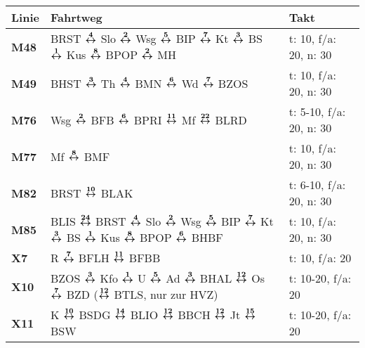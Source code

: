 \begin{minipage}[t]{0.05\textwidth}
\phantom{Tor}
\end{minipage}
\begin{minipage}[t]{0.45\textwidth}
\begin{tabular}{>{\bfseries}L{1.2cm}L{9.0cm}L{3.0cm}}
{\bfseries Linie} & {\bfseries Fahrtweg} & {\bfseries Takt} \\
\hline
\mbus{} M48   & BRST $\xarwe{4}$ Slo $\xarwe{2}$ Wsg $\xarwe{5}$ BIP $\xarwe{7}$ Kt $\xarwe{3}$ BS $\xarwe{1}$ Kus $\xarwe{8}$ BPOP $\xarwe{2}$ MH                                  & t: 10, f/a: 20, n: 30      \\
\mbus{} M49   & BHST $\xarwe{3}$ Th $\xarwe{4}$ BMN $\xarwe{6}$ Wd $\xarwe{7}$ BZOS                                                                                                 & t: 10, f/a: 20, n: 30      \\
\mbus{} M76   & Wsg $\xarwe{2}$ BFB $\xarwe{6}$ BPRI $\xarwe{11}$ Mf $\xarwe{22}$ BLRD                                                                                              & t: 5-10, f/a: 20, n: 30    \\
\mbus{} M77   & Mf $\xarwe{8}$ BMF                                                                                                                                                  & t: 10, f/a: 20, n: 30      \\
\mbus{} M82   & BRST $\xarwe{10}$ BLAK                                                                                                                                              & t: 6-10, f/a: 20, n: 30    \\
\mbus{} M85   & BLIS $\xarwe{24}$ BRST $\xarwe{4}$ Slo $\xarwe{2}$ Wsg $\xarwe{5}$ BIP $\xarwe{7}$ Kt $\xarwe{3}$ BS $\xarwe{1}$ Kus $\xarwe{8}$ BPOP $\xarwe{6}$ BHBF              & t: 10, f/a: 20, n: 30      \\
\xbus{} X7    & R $\xarwe{7}$ BFLH $\xarwe{11}$ BFBB                                                                                                                                                    & t: 10, f/a: 20             \\
\xbus{} X10   & BZOS $\xarwe{3}$ Kfo $\xarwe{1}$ U $\xarwe{5}$ Ad $\xarwe{3}$ BHAL $\xarwe{12}$ Os $\xarwe{7}$ BZD ($\xarwe{12}$ BTLS, nur zur HVZ)                                 & t: 10-20, f/a: 20          \\
\xbus{} X11   & K $\xarwe{10}$ BSDG $\xarwe{14}$ BLIO $\xarwe{12}$ BBCH $\xarwe{12}$ Jt $\xarwe{15}$ BSW                                                                            & t: 10-20, f/a: 20          \\

\end{tabular}
\end{minipage}

